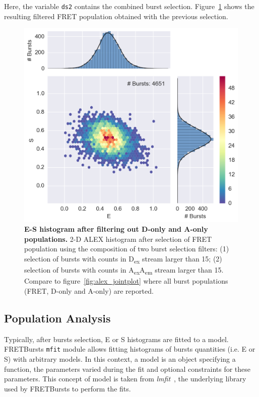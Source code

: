 \documentclass[10pt,letterpaper]{article}
\begin{document}
Here, the variable \verb|ds2| contains the combined burst selection.
Figure~\ref{fig:alex_jointplot_fretsel} shows the resulting filtered FRET
population obtained with the previous selection.


\begin{figure}[h!]
\begin{center}
\includegraphics[width=0.7\columnwidth]{figures/alex_jointplot_fretsel/alex_jointplot_fretsel}
\caption{\label{fig:alex_jointplot_fretsel}
\textbf{E-S histogram after filtering out D-only and A-only populations.}
2-D ALEX histogram after selection of FRET population
using the composition of two burst selection filters:
(1) selection of bursts with counts in D\textsubscript{ex} stream larger than 15;
(2) selection of bursts with counts in A\textsubscript{ex}A\textsubscript{em} stream larger than 15.
Compare to figure~\ref{fig:alex_jointplot} where all burst populations
(FRET, D-only and A-only) are reported.%
}
\end{center}
\end{figure}

\subsection*{Population Analysis}
\label{sec:fretfit}

Typically, after bursts selection, E or S histograms are fitted to a model.
FRETBursts \verb|mfit| module allows fitting histograms of bursts quantities
(i.e. E or S) with arbitrary models. In this context, a model is an object
specifying a function, the parameters varied during the fit
and optional constraints for these parameters. This concept of model
is taken from \textit{lmfit}~\cite{lmfit}, the underlying library used by
FRETBursts to perform the fits.
\end{document}
